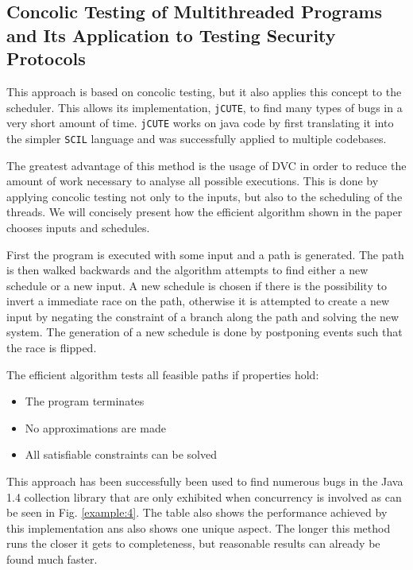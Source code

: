 \documentclass[10pt]{llncs}
\begin{document}
\subsection{Concolic Testing of Multithreaded Programs and	Its Application to Testing Security Protocols \cite{base4}}

This approach is based on concolic testing, but it also applies this concept to the scheduler. This allows its implementation, \texttt{jCUTE}, to find many types of bugs in a very short amount of time. \texttt{jCUTE} works on java code by first translating it into the simpler \texttt{SCIL} language and was successfully applied to multiple codebases.

The greatest advantage of this method is the usage of DVC in order to reduce the amount of work necessary to analyse all possible executions. This is done by applying concolic testing not only to the inputs, but also to the scheduling of the threads. We will concisely present how the efficient algorithm shown in the paper chooses inputs and schedules.

First the program is executed with some input and a path is generated. The path is then walked backwards and the algorithm attempts to find either a new schedule or a new input. A new schedule is chosen if there is the possibility to invert a immediate race on the path, otherwise it is attempted to create a new input by negating the constraint of a branch along the path and solving the new system. The generation of a new schedule is done by postponing events such that the race is flipped.

The efficient algorithm tests all feasible paths if properties hold:

\begin{itemize}
	\item The program terminates
	\item No approximations are made
	\item All satisfiable constraints can be solved
\end{itemize}

This approach has been successfully been used to find numerous bugs in the Java 1.4 collection library that are only exhibited when concurrency is involved as can be seen in Fig. \ref{example:4}. The table also shows the performance achieved by this implementation ans also shows one unique aspect. The longer this method runs the closer it gets to completeness, but reasonable results can already be found much faster.
\end{document}
